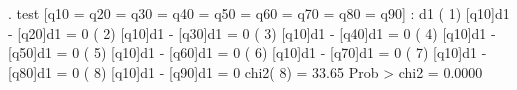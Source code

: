 . test [q10 = q20 = q30 = q40 = q50 = q60 = q70 = q80 = q90] : d1
{\smallskip}
 ( 1)  [q10]d1 - [q20]d1 = 0
 ( 2)  [q10]d1 - [q30]d1 = 0
 ( 3)  [q10]d1 - [q40]d1 = 0
 ( 4)  [q10]d1 - [q50]d1 = 0
 ( 5)  [q10]d1 - [q60]d1 = 0
 ( 6)  [q10]d1 - [q70]d1 = 0
 ( 7)  [q10]d1 - [q80]d1 = 0
 ( 8)  [q10]d1 - [q90]d1 = 0
{\smallskip}
           chi2(  8) =   33.65
         Prob > chi2 =    0.0000
{\smallskip}
